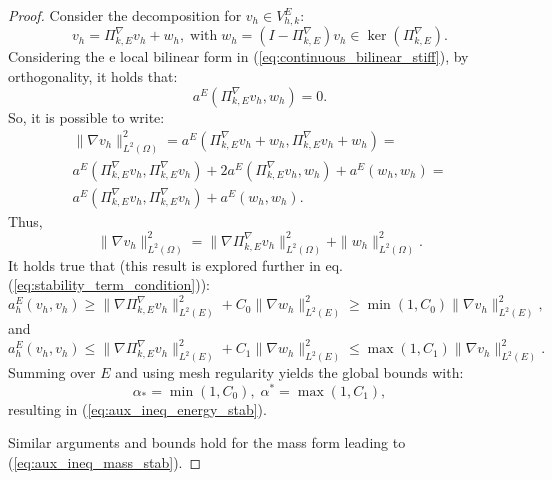 \documentclass[10pt,a4paper]{amsart}
\newcommand{\lebesguespace}[1]{L^2(#1)}
\newcommand{\localvespace}{V^E_{h,k}}
\newcommand{\scalenergyproj}{\Pi^{\nabla}_{k,E}}
\begin{document}
\begin{proof}
    Consider the decomposition for $v_h \in \localvespace$:
    \begin{equation}
    \nonumber
        v_h = \scalenergyproj v_h + w_h, \; \text{with} \; w_h = (I - \scalenergyproj)v_h \in \ker (\scalenergyproj).
    \end{equation}
    Considering the e local bilinear form in (\ref{eq:continuous_bilinear_stiff}), by orthogonality, it holds that:
    \begin{equation}
    \nonumber
        a^E(\scalenergyproj v_h, w_h) = 0.
    \end{equation}
    So, it is possible to write:
    \begin{equation}
    \nonumber
       \begin{split}
            \| \nabla v_h \|^2_{L^2(\Omega)} = a^E (\scalenergyproj v_h + w_h, \scalenergyproj v_h + w_h) = \\
            a^E(\scalenergyproj v_h, \scalenergyproj v_h) + 2 a^E(\scalenergyproj v_h, w_h) + a^E(w_h, w_h) = \\
            a^E(\scalenergyproj v_h, \scalenergyproj v_h) + a^E(w_h, w_h).
       \end{split}
    \end{equation}
    Thus,
    \begin{equation}
    \nonumber
        \| \nabla v_h \|^2_{L^2(\Omega)} = \| \nabla \scalenergyproj v_h \|^2_{L^2(\Omega)} + \| w_h \|^2_{L^2(\Omega)}.
    \end{equation}
    It holds true  that (this result is explored further in eq. (\ref{eq:stability_term_condition})):
    \begin{equation}
    \nonumber
        a^E_h(v_h, v_h) \geq \| \nabla \scalenergyproj v_h \|^2_{\lebesguespace{E}} + C_0 \| \nabla w_h \|^2_{\lebesguespace{E}} \geq \min (1, C_0) \| \nabla v_h \|^2_{\lebesguespace{E}},
    \end{equation}
    and
    \begin{equation}
    \nonumber
        a^E_h(v_h, v_h) \leq \| \nabla \scalenergyproj v_h \|^2_{\lebesguespace{E}} + C_1 \| \nabla w_h \|^2_{\lebesguespace{E}} \leq \max (1, C_1) \| \nabla v_h \|^2_{\lebesguespace{E}}.
    \end{equation}
    Summing over $E$ and using mesh regularity yields the global bounds with:
    \begin{equation}
    \nonumber
        \alpha_* = \min (1,C_0), \; \alpha^* = \max (1, C_1),
    \end{equation}
    resulting in (\ref{eq:aux_ineq_energy_stab}).

    Similar arguments and bounds hold for the mass form leading to (\ref{eq:aux_ineq_mass_stab}).
\end{proof}
\end{document}
